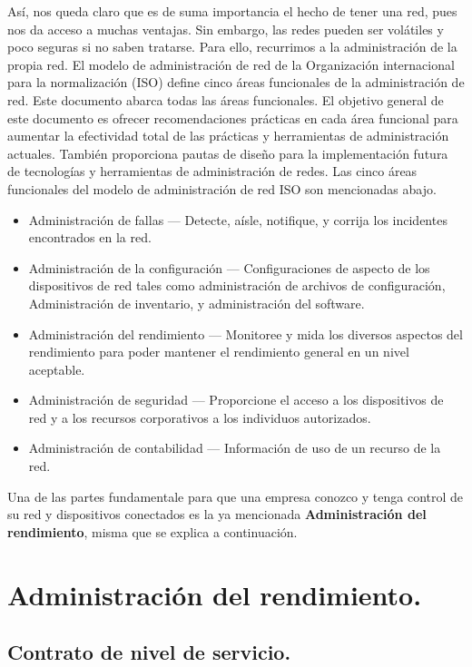 \noindent
Así, nos queda claro que es de suma importancia el hecho de tener una red, pues nos da acceso a muchas ventajas. Sin embargo, las redes pueden ser volátiles y poco seguras si no saben tratarse. Para ello, recurrimos a la administración de la propia red. 
\newline
El modelo de administración de red de la Organización internacional para la normalización (ISO) define cinco áreas funcionales de la administración de red. Este documento abarca todas las áreas funcionales. El objetivo general de este documento es ofrecer recomendaciones prácticas en cada área funcional para aumentar la efectividad total de las prácticas y herramientas de administración actuales. También proporciona pautas de diseño para la implementación futura de tecnologías y herramientas de administración de redes.
\newline
Las cinco áreas funcionales del modelo de administración de red ISO son mencionadas abajo.
\begin{itemize}
	\item Administración de fallas — Detecte, aísle, notifique, y corrija los incidentes encontrados en la red.
	\item Administración de la configuración — Configuraciones de aspecto de los dispositivos de red tales como administración de archivos de configuración, Administración de inventario, y administración del software.
	\item Administración del rendimiento — Monitoree y mida los diversos aspectos del rendimiento para poder mantener el rendimiento general en un nivel aceptable.
	\item Administración de seguridad — Proporcione el acceso a los dispositivos de red y a los recursos corporativos a los individuos autorizados.
	\item Administración de contabilidad — Información de uso de un recurso de la red.
\end{itemize}

\noindent
Una de las partes fundamentale para que una empresa conozco y tenga control de su red y dispositivos conectados es la ya mencionada \textbf{Administración del rendimiento}, misma que se explica a continuación.

\section{Administración del rendimiento.}

\subsection{Contrato de nivel de servicio.}

